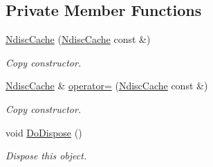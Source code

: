 \subsection*{Private Member Functions}
\begin{DoxyCompactItemize}
\item 
\hyperlink{classns3_1_1NdiscCache_a773ee8676b5b8e27252ca6809f919ea3}{Ndisc\+Cache} (\hyperlink{classns3_1_1NdiscCache}{Ndisc\+Cache} const \&)
\begin{DoxyCompactList}\small\item\em Copy constructor. \end{DoxyCompactList}\item 
\hyperlink{classns3_1_1NdiscCache}{Ndisc\+Cache} \& \hyperlink{classns3_1_1NdiscCache_a7dfdd80269f67c9b01ffed270dc5f7c3}{operator=} (\hyperlink{classns3_1_1NdiscCache}{Ndisc\+Cache} const \&)
\begin{DoxyCompactList}\small\item\em Copy constructor. \end{DoxyCompactList}\item 
void \hyperlink{classns3_1_1NdiscCache_ad5fd696cc6a9a7f120d810f39bf73180}{Do\+Dispose} ()
\begin{DoxyCompactList}\small\item\em Dispose this object. \end{DoxyCompactList}\end{DoxyCompactItemize}
